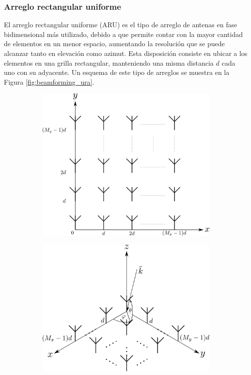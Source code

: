 \subsubsection{Arreglo rectangular uniforme}

El arreglo rectangular uniforme (ARU) es el tipo de arreglo de antenas en fase bidimensional más utilizado, debido a que permite contar con la mayor cantidad de elementos en un menor espacio, aumentando la resolución que se puede alcanzar tanto en elevación como azimut. Esta disposición consiste en ubicar a los elementos en una grilla rectangular, manteniendo una misma distancia $d$ cada uno con su adyacente. Un esquema de este tipo de arreglos se muestra en la Figura \ref{fig:beamforming_ura}.

\begin{figure}
    \centering
    \begin{subfigure}[b]{0.6\textwidth}
        \centering
        \includegraphics[width=\linewidth]{images/02-Beamforming/ura.png}
    \end{subfigure}
    \hfill
    \begin{subfigure}[b]{0.7\textwidth}
        \centering
        \includegraphics[width=\linewidth]{images/02-Beamforming/ura_3d.png}

\end{subfigure}
\end{figure}
